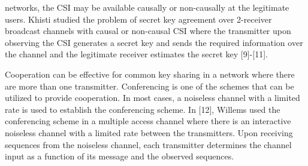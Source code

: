 \documentclass[conference,8pt]{IEEEtran}
\begin{document}
networks, the CSI may be available causally or non-causally at the legitimate users. Khisti  studied the  problem of secret key agreement over 2-receiver broadcast channels with causal or non-causal CSI where the transmitter upon observing the CSI generates a secret key and sends the required information over the channel and the legitimate receiver estimates the secret key  [9]-[11]. 

Cooperation can be effective for common key sharing in a network where there are more than one transmitter. Conferencing is one of the schemes that can be utilized to provide cooperation. In most cases, a noiseless channel with a limited rate is used to establish the conferencing scheme. In [12], Willems used the conferencing scheme in a multiple access channel where there is an interactive noiseless channel with a limited rate between the transmitters. Upon receiving sequences from the noiseless channel, each transmitter determines the channel input as a function of its message and the observed sequences.
\vspace{-1mm}
\end{document}
